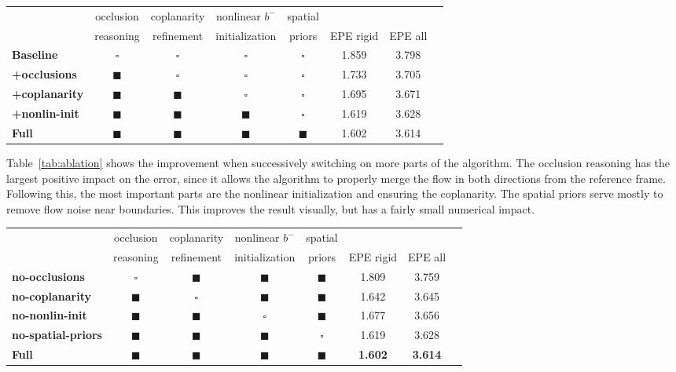 \documentclass[10pt,twocolumn,letterpaper]{article}
\begin{document}
\noindent
\begin{table*}[h!]
\centering
\begin{tabular}{lccccccc}
\toprule
& occlusion & coplanarity  & nonlinear $b^-$ & spatial & & \\
& reasoning & refinement   & initialization & priors & EPE rigid & EPE all \\
\midrule
\textbf{Baseline} & $\square$ & $\square$ & $\square$  &  $\square$ & 1.859 & 3.798 \\
\textbf{+occlusions} & $\blacksquare$ & $\square$ & $\square$  &  $\square$ & 1.733 & 3.705 \\
\textbf{+coplanarity} & $\blacksquare$ & $\blacksquare$ & $\square$  &  $\square$ & 1.695 & 3.671 \\
\textbf{+nonlin-init} & $\blacksquare$ & $\blacksquare$ & $\blacksquare$  &  $\square$ & 1.619 & 3.628 \\
\textbf{Full} & $\blacksquare$ & $\blacksquare$ & $\blacksquare$  &  $\blacksquare$ & 1.602 & 3.614 \\
\bottomrule
\end{tabular}
\caption{Errors when successively switching on parts of the algorithm}
\label{tab:ablation}
\end{table*}

Table~\ref{tab:ablation} shows the improvement when successively switching on more parts of the algorithm.
The occlusion reasoning has the largest positive impact on the error, since it allows the algorithm to properly merge the flow in both directions from the reference frame.
Following this, the most important parts are the nonlinear initialization and ensuring the coplanarity.
The spatial priors serve mostly to remove flow noise near boundaries. 
This improves the result visually, but has a fairly small numerical impact.

\begin{table*}[h!]
\centering
\begin{tabular}{lccccccc}
\toprule
& occlusion & coplanarity  & nonlinear $b^-$ & spatial & & \\
& reasoning & refinement   & initialization & priors & EPE rigid & EPE all \\
\midrule
\textbf{no-occlusions} & $\square$ & $\blacksquare$ & $\blacksquare$ &  $\blacksquare$ & 1.809 & 3.759 \\
\textbf{no-coplanarity} & $\blacksquare$ & $\square$ & $\blacksquare$ &  $\blacksquare$ & 1.642 & 3.645 \\
\textbf{no-nonlin-init} & $\blacksquare$ & $\blacksquare$ & $\square$ &  $\blacksquare$ & 1.677 & 3.656 \\
\textbf{no-spatial-priors} & $\blacksquare$ & $\blacksquare$ & $\blacksquare$ &  $\square$ & 1.619 & 3.628 \\
\textbf{Full} & $\blacksquare$ & $\blacksquare$ & $\blacksquare$  &  $\blacksquare$ & \textbf{1.602} & \textbf{3.614} \\
\bottomrule
\end{tabular}
\caption{Errors when disabling individual parts of the algorithm}
\label{tab:disabling}
\end{table*}
\end{document}

